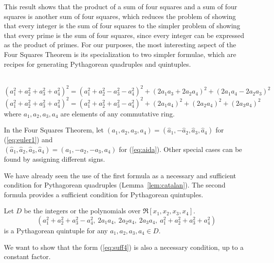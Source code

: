 This result shows that the product of a sum of four squares and a sum of four
squares is another sum of four squares,
which reduces the problem of showing that every integer is the sum
of four squares to the simpler problem
of showing that every prime is the sum of four squares,
since every integer can be expressed as the product of primes.
For our purposes, the most interesting aspect of 
the Four Squares Theorem is its specialization to 
two simpler formulae, which are recipes for
generating Pythagorean quadruples and quintuples.

\begin{lemma}[Euler]
\label{lem:corEuler4square}
\ \ \\
\begin{equation}
\label{eq:euler1}
(a_1^2 + a_2^2 + a_3^2 + a_4^2)^2 = 
(a_1^2 + a_2^2 - a_3^2 - a_4^2)^2 + (2a_1a_3+2a_2a_4)^2 + (2a_1a_4-2a_2a_3)^2
\end{equation}
%
\begin{equation}
\label{eq:aida}
(a_1^2 + a_2^2 + a_3^2 + a_4^2)^2 = 
(a_1^2 + a_2^2 + a_3^2 - a_4^2)^2 + (2a_1a_4)^2 + (2a_2a_4)^2 + (2a_3a_4)^2
\end{equation}
where $a_1,a_2,a_3,a_4$ are elements of any commutative ring.
\end{lemma}
\prf
In the Four Squares Theorem, let 
$(a_1,a_2,a_3,a_4) = (\hat{a}_1,-\hat{a}_2,\hat{a}_3,\hat{a}_4)$
for (\ref{eq:euler1}) and \\
$(\hat{a}_1,\hat{a}_2,\hat{a}_3,\hat{a}_4) = (a_1,-a_2,-a_3,a_4)$ 
for (\ref{eq:aida}).
Other special cases can be found by assigning different signs.
\QED

We have already seen the use of the first formula as a necessary and
sufficient condition for Pythagorean quadruples (Lemma~\ref{lem:catalan}).
The second formula provides a sufficient condition for Pythagorean quintuples.

\begin{lemma}
\label{lem:suff4}
Let $D$ be the integers or the polynomials over $\Re[x_1,x_2,x_3,x_4]$.
\begin{equation}
\label{eq:suff4}
	(a_1^2 + a_2^2 + a_3^2 - a_4^2,\ 2a_1a_4,\ 2a_2a_4,\ 2a_3a_4,\ 
	 a_1^2 + a_2^2 + a_3^2 + a_4^2)
\end{equation}
is a Pythagorean quintuple for any $a_1,a_2,a_3,a_4 \in D$.
\end{lemma}

We want to show that the form (\ref{eq:suff4}) is also a necessary condition,
up to a constant factor.


